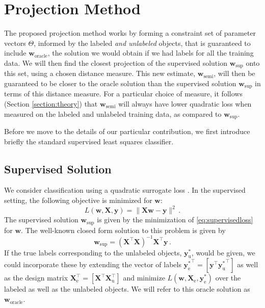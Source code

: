 \documentclass[twoside]{memoir}\usepackage[]{graphicx}\usepackage{xcolor}
\newcommand{\Xe}{\mathbf{X}_\mathrm{e}  }
\renewcommand{\vec}{\mathbf}
\begin{document}
\section{Projection Method}
\label{section:projections}
The proposed projection method works by forming a constraint set of parameter vectors $\Theta$, informed by the labeled \emph{and unlabeled} objects, that is guaranteed to include $\vec{w}_\text{oracle}$, the solution we would obtain if we had labels for all the training data. We will then find the closest projection of the supervised solution $\vec{w}_{\text{sup}}$ onto this set, using a chosen distance measure. This new estimate, $\vec{w}_{\text{semi}}$, will then be guaranteed to be closer to the oracle solution than the supervised solution $\vec{w}_{\text{sup}}$ in terms of this distance measure. For a particular choice of measure, it follows (Section \ref{section:theory}) that $\vec{w}_{\text{semi}}$ will always have lower quadratic loss when measured on the labeled and unlabeled training data, as compared to $\vec{w}_{\text{sup}}$.

Before we move to the details of our particular contribution, we first introduce briefly the standard supervised least squares classifier.

\subsection{Supervised Solution}
We consider classification using a quadratic surrogate loss \citep{Hastie2009}. In the supervised setting, the following objective is minimized for $\vec{w}$:
\begin{equation}
\label{eq:supervisedloss}
L(\vec{w},\vec{X},\vec{y}) = \lVert \vec{X} \vec{w} - \vec{y} \rVert^2 \,.
\end{equation}
The supervised solution $\vec{w}_{\text{sup}}$ is given by the minimization of \eqref{eq:supervisedloss} for $\vec{w}$. The well-known closed form solution to this problem is given by
\begin{equation}
\label{eq:supervisedsolution}
\vec{w}_{\text{sup}} = (\vec{X}^\top \vec{X})^{-1} \vec{X}^\top \vec{y} \,.
\end{equation}
If the true labels corresponding to the unlabeled objects, $\vec{y}_\text{u}^{\ast}$, would be given, we could incorporate these by extending the vector of labels ${\vec{y}_\text{e}^\ast}^\top = \left[ \vec{y}^\top {\vec{y}_\text{u}^\ast}^\top \right]$ as well as the design matrix $\vec{X}_\text{e}^\top = \left[ \vec{X}^\top \vec{X}_\text{u}^\top \right]$ and minimize $L(\vec{w},\Xe, \vec{y}_\text{e}^\ast)$ over the labeled as well as the unlabeled objects. We will refer to this oracle solution as $\vec{w}_\text{oracle}$. 
\end{document}
